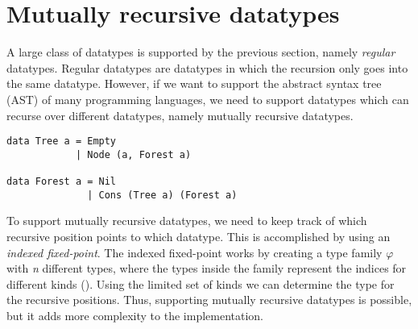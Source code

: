 \section{Mutually recursive datatypes}
A large class of datatypes is supported by the previous section, namely \textit{regular} datatypes. Regular datatypes are datatypes in which the recursion only goes into the same datatype. However, if we want to support the abstract syntax tree (AST) of many programming languages, we need to support datatypes which can recurse over different datatypes, namely mutually recursive datatypes.

\begin{verbatim}
data Tree a = Empty 
            | Node (a, Forest a)

data Forest a = Nil
              | Cons (Tree a) (Forest a)
\end{verbatim}

To support mutually recursive datatypes, we need to keep track of which recursive position points to which datatype. This is accomplished by using an \textit{indexed fixed-point}\cite{yakushev2009generic}. The indexed fixed-point works by creating a type family $\varphi$ with \textit{n} different types, where the types inside the family represent the indices for different kinds (\inlinehaskell{*!$_{\varphi}$!}). Using the limited set of kinds we can determine the type for the recursive positions. Thus, supporting mutually recursive datatypes is possible, but it adds more complexity to the implementation.   